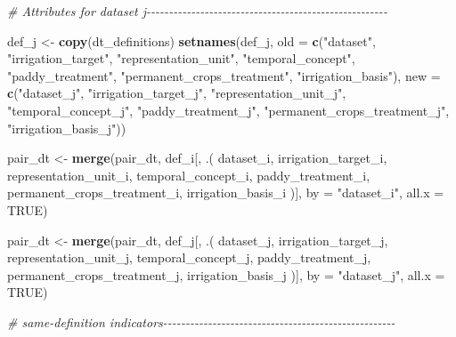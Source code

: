 \documentclass[
  11pt,
]{article}
\newenvironment{Shaded}{\begin{snugshade}}{\end{snugshade}}
\newcommand{\AttributeTok}[1]{\textcolor[rgb]{0.13,0.29,0.53}{#1}}
\newcommand{\CommentTok}[1]{\textcolor[rgb]{0.56,0.35,0.01}{\textit{#1}}}
\newcommand{\ConstantTok}[1]{\textcolor[rgb]{0.56,0.35,0.01}{#1}}
\newcommand{\FunctionTok}[1]{\textcolor[rgb]{0.13,0.29,0.53}{\textbf{#1}}}
\newcommand{\NormalTok}[1]{#1}
\newcommand{\OtherTok}[1]{\textcolor[rgb]{0.56,0.35,0.01}{#1}}
\newcommand{\StringTok}[1]{\textcolor[rgb]{0.31,0.60,0.02}{#1}}
\begin{document}
\begin{Shaded}
\begin{Highlighting}[]
\CommentTok{\# Attributes for dataset j{-}{-}{-}{-}{-}{-}{-}{-}{-}{-}{-}{-}{-}{-}{-}{-}{-}{-}{-}{-}{-}{-}{-}{-}{-}{-}{-}{-}{-}{-}{-}{-}{-}{-}{-}{-}{-}{-}{-}{-}{-}{-}{-}{-}{-}{-}{-}{-}{-}{-}{-}{-}{-}{-}}

\NormalTok{def\_j }\OtherTok{\textless{}{-}} \FunctionTok{copy}\NormalTok{(dt\_definitions)}
\FunctionTok{setnames}\NormalTok{(def\_j,}
         \AttributeTok{old =} \FunctionTok{c}\NormalTok{(}\StringTok{"dataset"}\NormalTok{, }\StringTok{"irrigation\_target"}\NormalTok{, }\StringTok{"representation\_unit"}\NormalTok{,}
                 \StringTok{"temporal\_concept"}\NormalTok{, }\StringTok{"paddy\_treatment"}\NormalTok{,}
                 \StringTok{"permanent\_crops\_treatment"}\NormalTok{, }\StringTok{"irrigation\_basis"}\NormalTok{),}
         \AttributeTok{new =} \FunctionTok{c}\NormalTok{(}\StringTok{"dataset\_j"}\NormalTok{, }\StringTok{"irrigation\_target\_j"}\NormalTok{, }\StringTok{"representation\_unit\_j"}\NormalTok{,}
                 \StringTok{"temporal\_concept\_j"}\NormalTok{, }\StringTok{"paddy\_treatment\_j"}\NormalTok{,}
                 \StringTok{"permanent\_crops\_treatment\_j"}\NormalTok{, }\StringTok{"irrigation\_basis\_j"}\NormalTok{))}

\NormalTok{pair\_dt }\OtherTok{\textless{}{-}} \FunctionTok{merge}\NormalTok{(pair\_dt, def\_i[, .(}
\NormalTok{  dataset\_i,}
\NormalTok{  irrigation\_target\_i,}
\NormalTok{  representation\_unit\_i,}
\NormalTok{  temporal\_concept\_i,}
\NormalTok{  paddy\_treatment\_i,}
\NormalTok{  permanent\_crops\_treatment\_i,}
\NormalTok{  irrigation\_basis\_i}
\NormalTok{)], }\AttributeTok{by =} \StringTok{"dataset\_i"}\NormalTok{, }\AttributeTok{all.x =} \ConstantTok{TRUE}\NormalTok{)}

\NormalTok{pair\_dt }\OtherTok{\textless{}{-}} \FunctionTok{merge}\NormalTok{(pair\_dt, def\_j[, .(}
\NormalTok{  dataset\_j,}
\NormalTok{  irrigation\_target\_j,}
\NormalTok{  representation\_unit\_j,}
\NormalTok{  temporal\_concept\_j,}
\NormalTok{  paddy\_treatment\_j,}
\NormalTok{  permanent\_crops\_treatment\_j,}
\NormalTok{  irrigation\_basis\_j}
\NormalTok{)], }\AttributeTok{by =} \StringTok{"dataset\_j"}\NormalTok{, }\AttributeTok{all.x =} \ConstantTok{TRUE}\NormalTok{)}

\CommentTok{\# same{-}definition indicators{-}{-}{-}{-}{-}{-}{-}{-}{-}{-}{-}{-}{-}{-}{-}{-}{-}{-}{-}{-}{-}{-}{-}{-}{-}{-}{-}{-}{-}{-}{-}{-}{-}{-}{-}{-}{-}{-}{-}{-}{-}{-}{-}{-}{-}{-}{-}{-}{-}{-}{-}{-}}


\end{Highlighting}
\end{Shaded}
\end{document}
